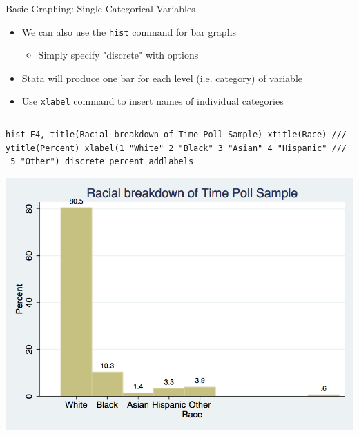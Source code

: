 \documentclass[table,smaller]{beamer}
\begin{document}
\begin{frame}[fragile,label=sec-2-7]{Basic Graphing: Single Categorical Variables}
 \begin{itemize}
\item We can also use the \texttt{hist} command for bar graphs
\begin{itemize}
\item Simply specify "discrete" with options
\end{itemize}
\item Stata will produce one bar for each level (i.e. category) of variable
\item Use \texttt{xlabel} command to insert names of individual categories
\end{itemize}


\vspace{-.5em} \begin{columns}  \begin{block}{}
\begin{verbatim}
hist F4, title(Racial breakdown of Time Poll Sample) xtitle(Race) ///
ytitle(Percent) xlabel(1 "White" 2 "Black" 3 "Asian" 4 "Hispanic" ///
 5 "Other") discrete percent addlabels
\end{verbatim}

\vspace{-1.5em}

\includegraphics[width=.9\linewidth]{./images/bargraph.png}

\end{block} \end{columns}
\end{frame}
\end{document}
